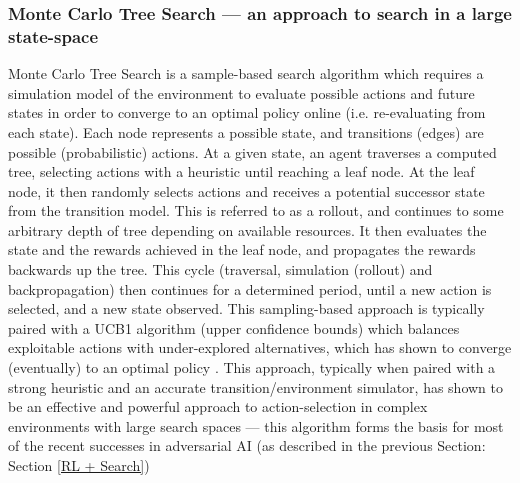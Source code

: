 \subsubsection{Monte Carlo Tree Search --- an approach to search in a large state-space}
Monte Carlo Tree Search is a sample-based search algorithm which requires a simulation model of the environment to evaluate possible actions and future states in order to converge to an optimal policy online (i.e. re-evaluating from each state). 
Each node represents a possible state, and transitions (edges) are possible (probabilistic) actions. At a given state, an agent traverses a computed tree, selecting actions with a heuristic until reaching a leaf node. At the leaf node, it then randomly selects actions and receives a potential successor state from the transition model. This is referred to as a rollout, and continues to some arbitrary depth of tree depending on available resources. It then evaluates the state and the rewards achieved in the leaf node, and propagates the rewards backwards up the tree. This cycle  (traversal, simulation (rollout) and backpropagation) then continues for a determined period, until a new action is selected, and a new state observed. 
\newline \newline
This sampling-based approach is typically paired with a UCB1 algorithm (upper confidence bounds) which balances exploitable actions with under-explored alternatives, which has shown to converge (eventually) to an optimal policy \cite{Ross2011}. 
\newline \newline
This approach, typically when paired with a strong heuristic and an accurate transition/environment simulator, has shown to be an effective and powerful approach to action-selection in complex environments with large search spaces --- this algorithm forms the basis for most of the recent successes in adversarial AI (as described in the previous Section: Section \ref{RL + Search}) 


